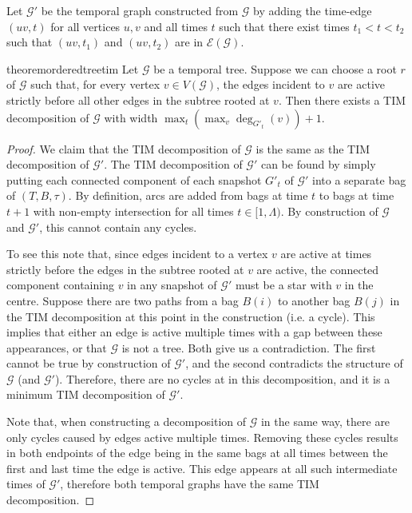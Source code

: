 \documentclass[a4paper,UKenglish,cleveref, autoref, thm-restate]{lipics-v2021} %
\begin{document}
\begin{toappendix}
Let $\mathcal{G}'$ be the temporal graph constructed from $\mathcal{G}$ by adding the time-edge $(uv,t)$ for all vertices $u,v$ and all times $t$ such that there exist times $t_1<t<t_2$ such that $(uv,t_1)$ and $(uv,t_2)$ are in $\mathcal{E}(\mathcal{G})$.
\begin{restatable}{theorem}{orderedtreetim}\label{thm:ordered-tree-low-timw}
    Let $\mathcal{G}$ be a temporal tree. Suppose we can choose a root $r$ of $\mathcal{G}$ such that, for every vertex $v\in V(\mathcal{G})$, the edges incident to $v$ are active strictly before all other edges in the subtree rooted at $v$. Then there exists a TIM decomposition of $\mathcal{G}$ with width $\max_t(\max_v\deg_{G'_t}(v))+1$. 
\end{restatable}
\begin{proof}
    We claim that the TIM decomposition of $\mathcal{G}$ is the same as the TIM decomposition of $\mathcal{G}'$. The TIM decomposition of $\mathcal{G}'$ can be found by simply putting each connected component of each snapshot $G'_t$ of $\mathcal{G}'$ into a separate bag of $(T,B,\tau)$. By definition, arcs are added from bags at time $t$ to bags at time $t+1$ with non-empty intersection for all times $t\in [1,\Lambda)$. By construction of $\mathcal{G}$ and $\mathcal{G}'$, this cannot contain any cycles. 
    
    To see this note that, since edges incident to a vertex $v$ are active at times strictly before the edges in the subtree rooted at $v$ are active, the connected component containing $v$ in any snapshot of $\mathcal{G}'$ must be a star with $v$ in the centre. Suppose there are two paths from a bag $B(i)$ to another bag $B(j)$ in the TIM decomposition at this point in the construction (i.e. a cycle). This implies that either an edge is active multiple times with a gap between these appearances, or that $\mathcal{G}$ is not a tree. Both give us a contradiction. The first cannot be true by construction of $\mathcal{G}'$, and the second contradicts the structure of $\mathcal{G}$ (and $\mathcal{G}'$). Therefore, there are no cycles at in this decomposition, and it is a minimum TIM decomposition of $\mathcal{G}'$. 
    
    Note that, when constructing a decomposition of $\mathcal{G}$ in the same way, there are only cycles caused by edges active multiple times. Removing these cycles results in both endpoints of the edge being in the same bags at all times between the first and last time the edge is active. This edge appears at all such intermediate times of $\mathcal{G}'$, therefore both temporal graphs have the same TIM decomposition.
    

\end{proof}
\end{toappendix}
\end{document}
